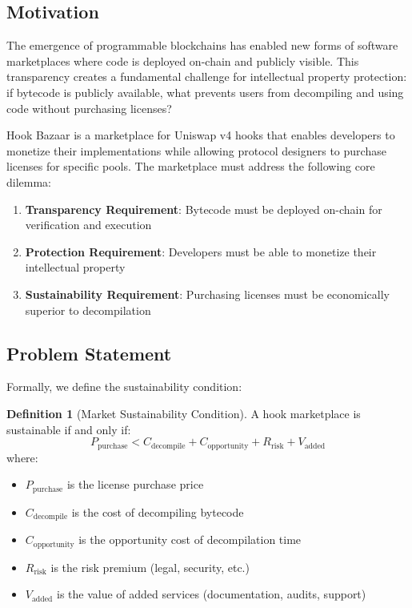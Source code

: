 \documentclass[11pt,a4paper]{article}
\theoremstyle{definition}
\newtheorem{definition}{Definition}[section]
\theoremstyle{remark}
\begin{document}
\subsection{Motivation}

The emergence of programmable blockchains has enabled new forms of software marketplaces where code is deployed on-chain and publicly visible. This transparency creates a fundamental challenge for intellectual property protection: if bytecode is publicly available, what prevents users from decompiling and using code without purchasing licenses?

Hook Bazaar is a marketplace for Uniswap v4 hooks that enables developers to monetize their implementations while allowing protocol designers to purchase licenses for specific pools. The marketplace must address the following core dilemma:

\begin{enumerate}
    \item \textbf{Transparency Requirement}: Bytecode must be deployed on-chain for verification and execution
    \item \textbf{Protection Requirement}: Developers must be able to monetize their intellectual property
    \item \textbf{Sustainability Requirement}: Purchasing licenses must be economically superior to decompilation
\end{enumerate}

\subsection{Problem Statement}

Formally, we define the sustainability condition:

\begin{definition}[Market Sustainability Condition]
A hook marketplace is sustainable if and only if:
\begin{equation}
P_{\text{purchase}} < C_{\text{decompile}} + C_{\text{opportunity}} + R_{\text{risk}} + V_{\text{added}}
\end{equation}
where:
\begin{itemize}
    \item $P_{\text{purchase}}$ is the license purchase price
    \item $C_{\text{decompile}}$ is the cost of decompiling bytecode
    \item $C_{\text{opportunity}}$ is the opportunity cost of decompilation time
    \item $R_{\text{risk}}$ is the risk premium (legal, security, etc.)
    \item $V_{\text{added}}$ is the value of added services (documentation, audits, support)
\end{itemize}
\end{definition}
\end{document}
